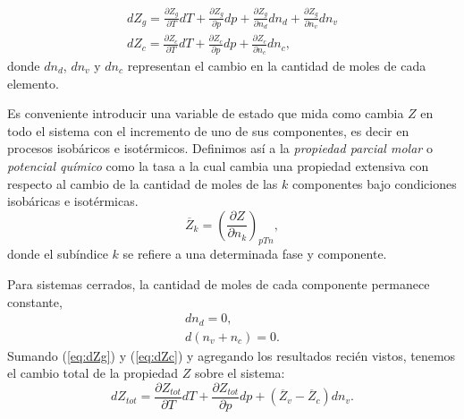 \documentclass[openany]{book}
\begin{document}
\begin{gather}
	dZ_{g}=\frac{\partial Z_{g}}{\partial T}dT+\frac{\partial Z_{g}}{\partial p}dp+\frac{\partial Z_{g}}{\partial n_{d}}dn_{d}+\frac{\partial Z_{g}}{\partial n_{v}}dn_{v}\label{eq:dZg}\\
	dZ_{c}=\frac{\partial Z_{c}}{\partial T}dT+\frac{\partial Z_{c}}{\partial p}dp+\frac{\partial Z_{c}}{\partial n_{c}}dn_{c}\label{eq:dZc},
\end{gather}
donde $dn_{d}$, $dn_{v}$ y $dn_{c}$ representan el cambio en la cantidad de moles de cada elemento.
\par Es conveniente introducir una variable de estado que mida como cambia $Z$ en todo el sistema con el incremento de uno de sus componentes, es decir en procesos isobáricos e isotérmicos. Definimos así a la \emph{propiedad parcial molar} o \emph{potencial químico} como la tasa a la cual cambia una propiedad extensiva con respecto al cambio de la cantidad de moles de las $k$ componentes bajo condiciones isobáricas e isotérmicas.
\begin{equation}\label{eq:Zk}
	\overline{Z}_{k}=\left(\frac{\partial Z}{\partial n_{k}}\right)_{pTn},
\end{equation}
donde el subíndice $k$ se refiere a una determinada fase y componente.
\par Para sistemas cerrados, la cantidad de moles de cada componente permanece constante,
\begin{gather}
	dn_{d}=0\label{eq:dnd-0},\\
	d(n_{v}+n_{c})=0\label{eq:dnvnc-0}.
\end{gather}
Sumando (\ref{eq:dZg}) y (\ref{eq:dZc}) y agregando los resultados recién vistos, tenemos el cambio total de la propiedad $Z$ sobre el sistema:
\begin{equation}\label{eq:dZtot}
	dZ_{tot}=\frac{\partial Z_{tot}}{\partial T}dT+\frac{\partial Z_{tot}}{\partial p}dp+(\overline{Z}_{v}-\overline{Z}_{c})dn_{v}.
\end{equation}
\end{document}
